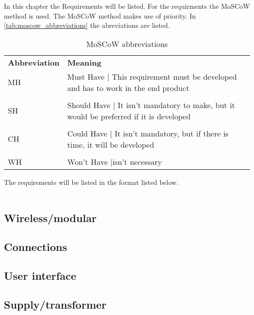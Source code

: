 In this chapter the Requirements will be listed. For the requirments the MoSCoW method is used. The MoSCoW method makes use of priority. In \autoref{tab:moscow_abbreviations} the abreviations are listed.

\begin{table}[H]
\centering
    \begin{tabular}{l p{8cm}}
        \textbf{Abbreviation} & \textbf{Meaning} \\
        MH & Must Have | This requirement must be developed and has to work in the end product\\
        & \\
        SH & Should Have | It isn't mandatory to make, but it would be preferred if it is developed\\
        & \\
        CH & Could Have | It isn't mandatory, but if there is time, it will be developed\\
        & \\
        WH & Won't Have |isn't necessary\\
    \end{tabular}
    \caption{MoSCoW abbreviations}
    \label{tab:moscow_abbreviations}
\end{table}

The requirements will be listed in the format listed below.\\

\\


\subsection{Wireless/modular}

\subsection{Connections}


\subsection{User interface}


\subsection{Supply/transformer}

